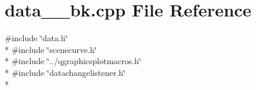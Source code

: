 \section{data\+\_\+\+\_\+bk.\+cpp File Reference}
\label{curve_2data____bk_8cpp}
{\ttfamily \#include \char`\"{}data.\+h\char`\"{}}\\*
{\ttfamily \#include \char`\"{}scenecurve.\+h\char`\"{}}\\*
{\ttfamily \#include \char`\"{}../qgraphicsplotmacros.\+h\char`\"{}}\\*
{\ttfamily \#include \char`\"{}datachangelistener.\+h\char`\"{}}\\*
